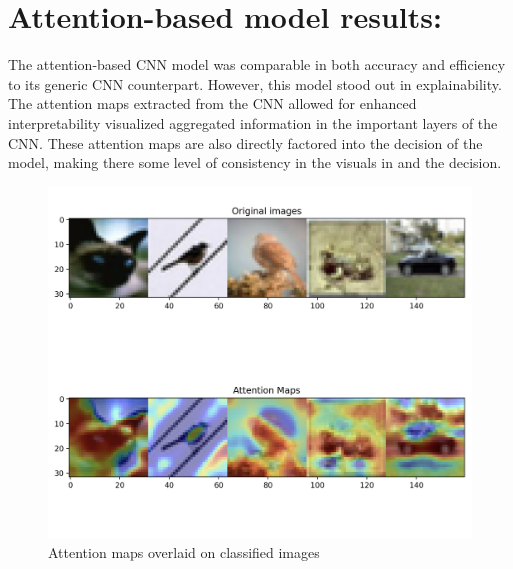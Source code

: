\section{Attention-based model results:} The attention-based CNN model was comparable in both accuracy and efficiency to its generic CNN counterpart. However, this model stood out in explainability. The attention maps extracted from the CNN allowed for enhanced interpretability visualized aggregated information in the important layers of the CNN. These attention maps are also directly factored into the decision of the model, making there some level of consistency in the visuals in and the decision.
\begin{figure}[hbt!]
    \centering
    \includegraphics[width=\linewidth]{images/attentionheatmap.png}
    \caption{Attention maps overlaid on classified images}
    \label{fig:result1}
\end{figure}


